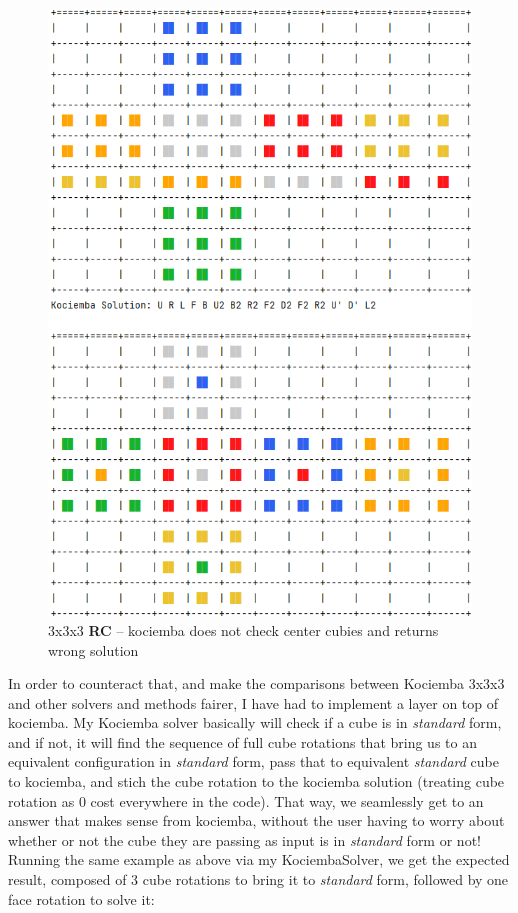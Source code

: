 \begin{figure}[H]
\centering
\includegraphics[scale=0.6]{./Figures/KociembaBug333}
\caption[Kociemba Bug]{3x3x3 \textbf{RC} -- kociemba does not check center cubies and returns wrong solution}
\label{fig:KociembaBug333}
\end{figure}
In order to counteract that, and make the comparisons between Kociemba 3x3x3 and other solvers and methods fairer, I have had to implement a layer on top of kociemba. My Kociemba solver basically will check if a cube is in \textit{standard} form, and if not, it will find the sequence of full cube rotations that bring us to an equivalent configuration in \textit{standard} form, pass that to equivalent \textit{standard} cube to kociemba, and stich the cube rotation to the kociemba solution (treating cube rotation as 0 cost everywhere in the code). That way, we seamlessly get to an answer that makes sense from kociemba, without the user having to worry about whether or not the cube they are passing as input is in \textit{standard} form or not! Running the same example as above via my KociembaSolver, we get the expected result, composed of 3 cube rotations to bring it to \textit{standard} form, followed by one face rotation to solve it:

